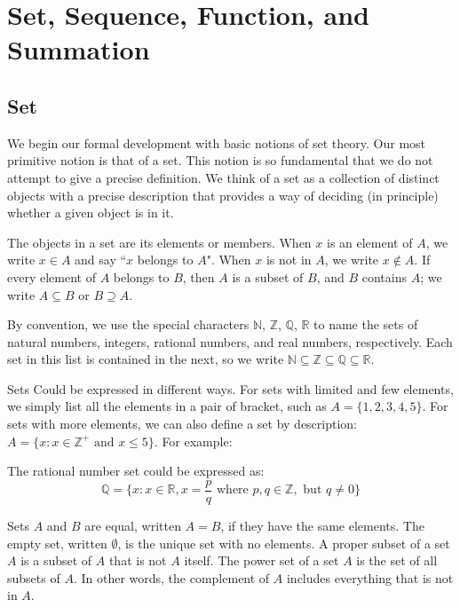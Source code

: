 \chapterspaceabove{6.75cm} 
\chapterspacebelow{7.25cm} 
\chapter{Set, Sequence, Function, and Summation}
\section{Set}
    We begin our formal development with basic notions of set theory. Our most primitive notion is that of a set. This notion is so fundamental that we do not attempt to give a precise definition. We think of a set as a collection of distinct objects with a precise description that provides a way of deciding (in principle) whether a given object is in it.

\begin{definition}[Set]
The objects in a set are its elements or members. When \( x \) is an element of \( A \), we write \( x \in A \) and say ``\( x \) belongs to \( A \)". When \( x \) is not in \( A \), we write \( x \notin A \). If every element of \( A \) belongs to \( B \), then \( A \) is a subset of \( B \), and \( B \) contains \( A \); we write \( A \subseteq B \) or \( B \supseteq A \).
\end{definition}

\begin{remark}
By convention, we use the special characters \( \mathbb{N} \), \( \mathbb{Z} \), \( \mathbb{Q} \), \( \mathbb{R} \) to name the sets of natural numbers, integers, rational numbers, and real numbers, respectively. Each set in this list is contained in the next, so we write \( \mathbb{N} \subseteq \mathbb{Z} \subseteq \mathbb{Q} \subseteq \mathbb{R} \).
\end{remark}

Sets Could be expressed in different ways. For sets with limited and few elements, we simply list all the elements in a pair of bracket, such as $A = \{1, 2, 3, 4, 5\}$. For sets with more elements, we can also define a set by description: $A = \{x: x\in \mathbb{Z^+} \text{ and } x \leq5 \}$. For example:
\begin{example}
    The rational number set could be expressed as:
    $$\mathbb{Q} = \{x: x\in \mathbb{R}, x = \frac{p}{q} \text{ where } p, q \in \mathbb{Z},\text{ but } q \neq 0\}$$
\end{example}

\begin{definition}
Sets \( A \) and \( B \) are equal, written \( A = B \), if they have the same elements. The empty set, written \( \emptyset \), is the unique set with no elements. A proper subset of a set \( A \) is a subset of \( A \) that is not \( A \) itself. The power set of a set \( A \) is the set of all subsets of \( A \).
In other words, the complement of \( A \) includes everything that is not in \( A \).
\end{definition}



